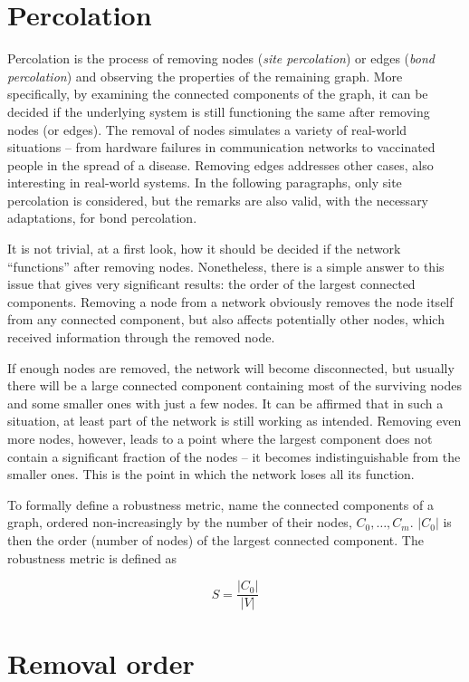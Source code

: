 \documentclass[a4paper,11pt,twoside,openleft]{memoir}
\begin{document}
\section{Percolation}\label{percolation}

Percolation is the process of removing nodes (\emph{site percolation})
or edges (\emph{bond percolation}) and observing the properties of the
remaining graph. More specifically, by examining the connected
components of the graph, it can be decided if the underlying system is
still functioning the same after removing nodes (or edges). The removal
of nodes simulates a variety of real-world situations -- from hardware
failures in communication networks to vaccinated people in the spread
of a disease. Removing edges addresses other cases, also interesting in
real-world systems. In the following paragraphs, only site percolation
is considered, but the remarks are also valid, with the necessary
adaptations, for bond percolation.

It is not trivial, at a first look, how it should be decided if the
network ``functions'' after removing nodes. Nonetheless, there is a
simple answer to this issue that gives very significant results: the
order of the largest connected components. Removing a node from a
network obviously removes the node itself from any connected component,
but also affects potentially other nodes, which received information
through the removed node.

If enough nodes are removed, the network will become disconnected, but
usually there will be a large connected component containing most of the
surviving nodes and some smaller ones with just a few nodes. It can be
affirmed that in such a situation, at least part of the network is still
working as intended. Removing even more nodes, however, leads to a point
where the largest component does not contain a significant fraction of
the nodes -- it becomes indistinguishable from the smaller ones. This is
the point in which the network loses all its function.

To formally define a robustness metric, name the connected components of
a graph, ordered non-increasingly by the number of their nodes,
$C_0, \ldots, C_m$. $|C_0|$ is then the order (number of nodes) of the
largest connected component. The robustness metric is defined as

\begin{equation}
S = \frac{|C_0|}{|V|}
\end{equation}

\section{Removal order}\label{removal-order}
\end{document}
